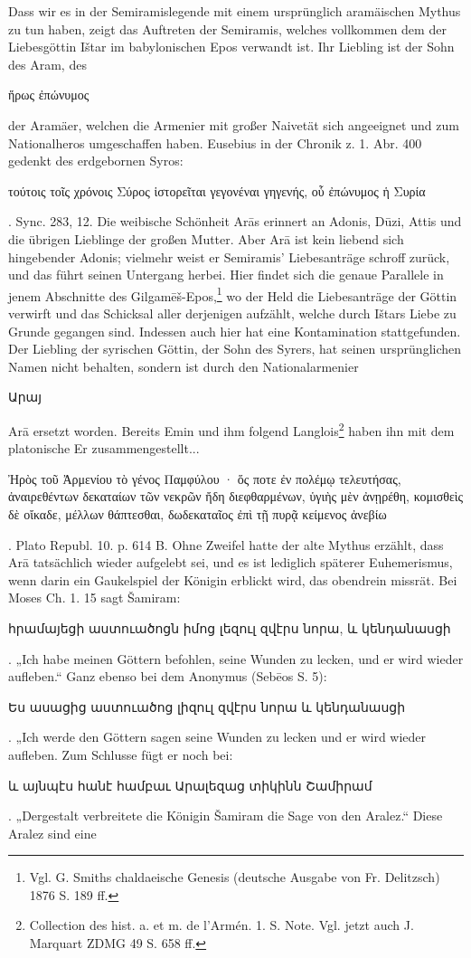\documentclass{article}
\begin{document}
Dass wir es in der Semiramislegende mit einem ursprünglich aramäischen Mythus zu tun haben, zeigt das Auftreten der Semiramis, welches vollkommen dem der Liebesgöttin Ištar im babylonischen Epos verwandt ist. Ihr Liebling ist der Sohn des Aram, des \begin{greek}ἥρως ἐπώνυμος\end{greek} der Aramäer, welchen die Armenier mit großer Naivetät sich angeeignet und zum Nationalheros umgeschaffen haben. Eusebius in der Chronik z. 1. Abr. 400 gedenkt des erdgebornen Syros: \begin{greek}τούτοις τοῖς χρόνοις Σύρος ἱστορεῖται γεγονέναι γηγενής, οὗ ἐπώνυμος ἡ Συρία\end{greek}. Sync. 283, 12. Die weibische Schönheit Arās erinnert an Adonis, Dūzi, Attis und die übrigen Lieblinge der großen Mutter. Aber Arā ist kein liebend sich hingebender Adonis; vielmehr weist er Semiramis' Liebesanträge schroff zurück, und das führt seinen Untergang herbei. Hier findet sich die genaue Parallele in jenem Abschnitte des Gilgamēš-Epos,\footnote{Vgl. G. Smiths chaldaeische Genesis (deutsche Ausgabe von Fr. Delitzsch) 1876 S. 189 ff.} wo der Held die Liebesanträge der Göttin verwirft und das Schicksal aller derjenigen aufzählt, welche durch Ištars Liebe zu Grunde gegangen sind. Indessen auch hier hat eine Kontamination stattgefunden. Der Liebling der syrischen Göttin, der Sohn des Syrers, hat seinen ursprünglichen Namen nicht behalten, sondern ist durch den Nationalarmenier \begin{armenian}Արայ\end{armenian} Arā ersetzt worden. Bereits Emin und ihm folgend Langlois\footnote{Collection des hist. a. et m. de l'Armén. 1. S. Note. Vgl. jetzt auch J. Marquart ZDMG 49 S. 658 ff.} haben ihn mit dem platonische Er zusammengestellt... \begin{greek}Ἠρὸς τοῦ Ἀρμενίου τὸ γένος Παμφύλου · ὅς ποτε ἐν πολέμῳ τελευτήσας, ἀναιρεθέντων δεκαταίων τῶν νεκρῶν ἤδη διεφθαρμένων, ὑγιὴς μὲν ἀνῃρέθη, κομισθεὶς δὲ οἴκαδε, μέλλων θάπτεσθαι, δωδεκαταῖος ἐπὶ τῇ πυρᾷ κείμενος ἀνεβίω\end{greek}. Plato Republ. 10. p. 614 B. Ohne Zweifel hatte der alte Mythus erzählt, dass Arā tatsächlich wieder aufgelebt sei, und es ist lediglich späterer Euhemerismus, wenn darin ein Gaukelspiel der Königin erblickt wird, das obendrein missrät. Bei Moses Ch. 1. 15 sagt Šamiram: \begin{armenian}հրամայեցի աստուածոցն իմոց լեզուլ զվէրս նորա, և կենդանասցի\end{armenian}. „Ich habe meinen Göttern befohlen, seine Wunden zu lecken, und er wird wieder aufleben.“ Ganz ebenso bei dem Anonymus (Sebēos S. 5): \begin{armenian}Ես ասացից աստուածոց լիզուլ զվէրս նորա և կենդանասցի\end{armenian}. „Ich werde den Göttern sagen seine Wunden zu lecken und er wird wieder aufleben. Zum Schlusse fügt er noch bei: \begin{armenian}և այնպէս հանէ համբաւ Արալեզաց տիկինն Շամիրամ\end{armenian}. „Dergestalt verbreitete die Königin Šamiram die Sage von den Aralez.“ Diese Aralez sind eine 
\end{document}
